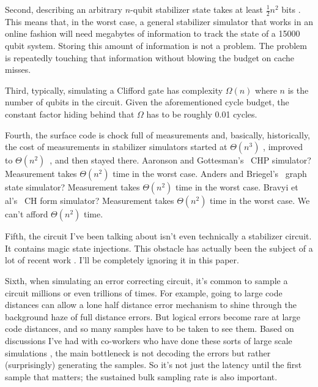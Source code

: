 \documentclass[onecolumn,unpublished]{quantumarticle}
\theoremstyle{definition}
\theoremstyle{definition}
\theoremstyle{definition}
\begin{document}
Second, describing an arbitrary $n$-qubit stabilizer state takes at least $\frac{1}{2} n^2$ bits \cite{gross2006hudson,karanjai2018contextuality,howmanystabilizers2021}.
This means that, in the worst case, a general stabilizer simulator that works in an online fashion will need megabytes of information to track the state of a 15000 qubit system.
Storing this amount of information is not a problem.
The problem is repeatedly touching that information without blowing the budget on cache misses.

Third, typically, simulating a Clifford gate has complexity $\Omega(n)$ where $n$ is the number of qubits in the circuit.
Given the aforementioned cycle budget, the constant factor hiding behind that $\Omega$ has to be roughly 0.01 cycles.

Fourth, the surface code is chock full of measurements and, basically, historically, the cost of measurements in stabilizer simulators started at $\Theta(n^3)$ \cite{gottesman1997stabilizerformalism}, improved to $\Theta(n^2)$~\cite{aaronson2004chp}, and then stayed there.
Aaronson and Gottesman's~\cite{aaronson2004chp} CHP simulator?
Measurement takes $\Theta(n^2)$ time in the worst case.
Anders and Briegel's~\cite{anders2006fastgraphsim} graph state simulator?
Measurement takes $\Theta(n^2)$ time in the worst case.
Bravyi et al's~\cite{bravyi2019simulation} CH form simulator?
Measurement takes $\Theta(n^2)$ time in the worst case.
We can't afford $\Theta(n^2)$ time.

Fifth, the circuit I've been talking about isn't even technically a stabilizer circuit.
It contains magic state injections.
This obstacle has actually been the subject of a lot of recent work \cite{bravyi2019simulation,bu2019efficient,huang2020feynman,huang2019approximate}.
I'll be completely ignoring it in this paper.

Sixth, when simulating an error correcting circuit, it's common to sample a circuit millions or even trillions of times.
For example, going to large code distances can allow a lone half distance error mechanism to shine through the background haze of full distance errors.
But logical errors become rare at large code distances, and so many samples have to be taken to see them.
Based on discussions I've had with co-workers who have done these sorts of large scale simulations \cite{conversationmikeasutin}, the main bottleneck is not decoding the errors but rather (surprisingly) generating the samples.
So it's not just the latency until the first sample that matters; the sustained bulk sampling rate is also important.
\end{document}
